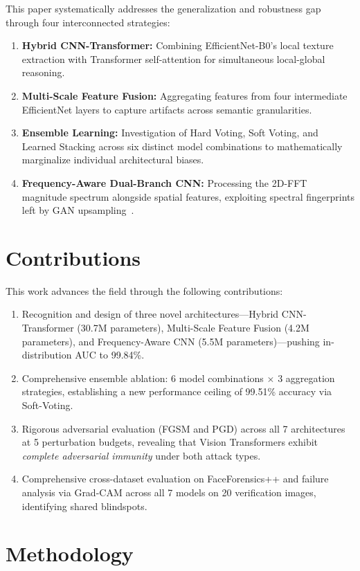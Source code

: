 \documentclass[runningheads]{llncs}
\begin{document}
This paper systematically addresses the generalization and robustness gap through four interconnected strategies:
\begin{enumerate}
    \item \textbf{Hybrid CNN-Transformer:} Combining EfficientNet-B0's local texture extraction with Transformer self-attention for simultaneous local-global reasoning.
    \item \textbf{Multi-Scale Feature Fusion:} Aggregating features from four intermediate EfficientNet layers to capture artifacts across semantic granularities.
    \item \textbf{Ensemble Learning:} Investigation of Hard Voting, Soft Voting, and Learned Stacking across six distinct model combinations to mathematically marginalize individual architectural biases.
    \item \textbf{Frequency-Aware Dual-Branch CNN:} Processing the 2D-FFT magnitude spectrum alongside spatial features, exploiting spectral fingerprints left by GAN upsampling~\cite{frequency_analysis}.
\end{enumerate}

\section{Contributions}
This work advances the field through the following contributions:
\begin{enumerate}
    \item Recognition and design of three novel architectures---Hybrid CNN-Transformer (30.7M parameters), Multi-Scale Feature Fusion (4.2M parameters), and Frequency-Aware CNN (5.5M parameters)---pushing in-distribution AUC to 99.84\%.
    \item Comprehensive ensemble ablation: 6 model combinations $\times$ 3 aggregation strategies, establishing a new performance ceiling of 99.51\% accuracy via Soft-Voting.
    \item Rigorous adversarial evaluation (FGSM and PGD) across all 7 architectures at 5 perturbation budgets, revealing that Vision Transformers exhibit \textit{complete adversarial immunity} under both attack types.
    \item Comprehensive cross-dataset evaluation on FaceForensics++ and failure analysis via Grad-CAM across all 7 models on 20 verification images, identifying shared blindspots.
\end{enumerate}

\section{Methodology}
\end{document}
